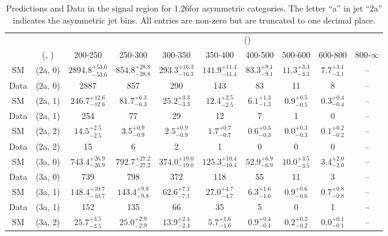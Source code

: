 \begin{table}[h!]
\tiny
\centering
\caption{Predictions and Data in the signal region for 1.26\ifb for asymmetric categories. The letter ``a'' in jet \eg ``2a''  indicates the asymmetric jet bins. All entries are non-zero but are truncated to one decimal place.\label{tab:yieldsewkdatapost_sig_comb_asym}}
\begin{tabular}
{cccccccccc}
	\hline\hline
&	&	& \multicolumn{8}{c}{\scalht (\gev)}\\ 
	&	 (\njet, \nb) & 200-250 & 250-300 & 300-350 & 350-400 & 400-500 & 500-600 & 600-800 & 800-$\infty$ \\ [0.8ex] 
\hline
	SM & (2a, 0) & $2894.8^{+ 53.6 }_{- 53.6 }$ & $854.8^{+ 28.8 }_{- 28.8 }$ & $293.3^{+ 16.3 }_{- 16.3 }$ & $141.9^{+ 11.4 }_{- 11.4 }$ & $83.3^{+ 9.1 }_{- 9.1 }$ & $11.3^{+ 3.3 }_{- 3.3 }$ & $7.7^{+ 3.1 }_{- 3.1 }$ & -- \\[0.5ex] 
	Data & (2a, 0) & 2887 & 857 & 290 & 143 & 83 & 11 & 8 & -- \\[0.5ex] 
	SM & (2a, 1) & $246.7^{+ 12.6 }_{- 12.6 }$ & $81.7^{+ 6.3 }_{- 6.3 }$ & $25.2^{+ 3.3 }_{- 3.3 }$ & $12.4^{+ 2.5 }_{- 2.5 }$ & $6.1^{+ 1.3 }_{- 1.3 }$ & $0.9^{+ 0.5 }_{- 0.5 }$ & $0.3^{+ 0.4 }_{- 0.4 }$ & -- \\[0.5ex] 
	Data & (2a, 1) & 254 & 77 & 29 & 12 & 7 & 1 & 0 & -- \\[0.5ex] 
	SM & (2a, 2) & $14.5^{+ 2.5 }_{- 2.5 }$ & $3.5^{+ 0.9 }_{- 0.9 }$ & $2.5^{+ 0.9 }_{- 0.9 }$ & $1.7^{+ 0.7 }_{- 0.7 }$ & $0.6^{+ 0.3 }_{- 0.3 }$ & $0.0^{+ 0.3 }_{- 0.3 }$ & $0.1^{+ 0.2 }_{- 0.2 }$ & -- \\[0.5ex] 
	Data & (2a, 2) & 15 & 6 & 2 & 1 & 0 & 0 & 0 & -- \\[0.5ex] 
	SM & (3a, 0) & $743.4^{+ 26.9 }_{- 26.9 }$ & $792.7^{+ 27.2 }_{- 27.2 }$ & $374.0^{+ 19.0 }_{- 19.0 }$ & $125.3^{+ 10.4 }_{- 10.4 }$ & $52.9^{+ 6.9 }_{- 6.9 }$ & $10.0^{+ 3.5 }_{- 3.5 }$ & $3.4^{+ 2.0 }_{- 2.0 }$ & -- \\[0.5ex] 
	Data & (3a, 0) & 739 & 798 & 372 & 118 & 55 & 11 & 3 & -- \\[0.5ex] 
	SM & (3a, 1) & $148.4^{+ 10.7 }_{- 10.7 }$ & $143.4^{+ 9.8 }_{- 9.8 }$ & $62.6^{+ 7.1 }_{- 7.1 }$ & $27.0^{+ 4.7 }_{- 4.7 }$ & $6.3^{+ 1.6 }_{- 1.6 }$ & $0.9^{+ 0.6 }_{- 0.6 }$ & $0.7^{+ 0.8 }_{- 0.8 }$ & -- \\[0.5ex] 
	Data & (3a, 1) & 152 & 135 & 66 & 35 & 5 & 0 & 1 & -- \\[0.5ex] 
	SM & (3a, 2) & $25.7^{+ 3.5 }_{- 3.5 }$ & $25.0^{+ 2.9 }_{- 2.9 }$ & $13.9^{+ 2.4 }_{- 2.4 }$ & $5.7^{+ 1.6 }_{- 1.6 }$ & $0.9^{+ 0.4 }_{- 0.4 }$ & $0.2^{+ 0.2 }_{- 0.2 }$ & $0.0^{+ 0.1 }_{- 0.1 }$ & -- \\[0.5ex] 

\end{tabular}
\end{table}
